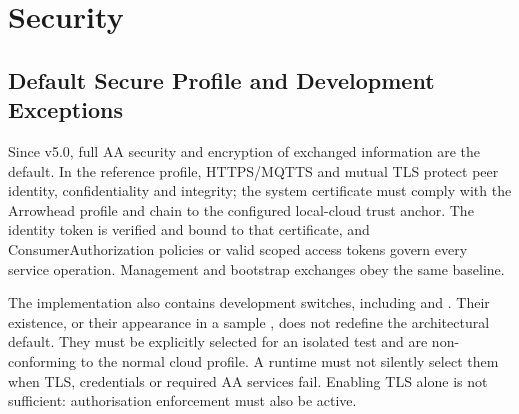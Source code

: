 \documentclass[a4paper]{arrowhead}
\begin{document}
\section{Security}
\label{sec:security}

\subsection{Default Secure Profile and Development Exceptions}
\label{sec:secure-default}
Since v5.0, full AA security and encryption of exchanged information are the default.
In the reference profile, HTTPS/MQTTS and mutual TLS protect peer identity,
confidentiality and integrity; the system certificate must comply with the Arrowhead
profile and chain to the configured local-cloud trust anchor. The
 identity token is verified and bound to that certificate, and
ConsumerAuthorization policies or valid scoped access tokens govern every service
operation. Management and bootstrap exchanges obey the same baseline.

The implementation also contains development switches, including
 and .
Their existence, or their appearance in a sample ,
does not redefine the architectural default. They must be explicitly selected for
an isolated test and are non-conforming to the normal cloud profile. A runtime
must not silently select them when TLS, credentials or required AA services fail.
Enabling TLS alone is not sufficient: authorisation enforcement must also be active.
\end{document}

